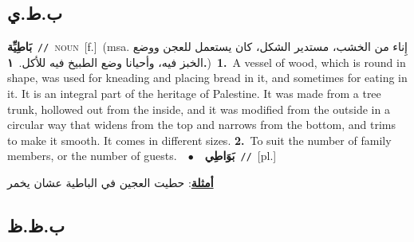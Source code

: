 \documentclass[10pt,a4paper,twoside]{article} %
\begin{document}
\begin{multicols}{2}
\vspace{-3mm}
\subsection*{\color{blue}\foreignlanguage{arabic}{ب.ط.ي}\color{blue}{}} 

{\setlength\topsep{0pt}\textbf{\foreignlanguage{arabic}{بَاطِيِّة}}\ {\color{gray}\texttt{//}\color{black}}\ \textsc{noun}\ [f.]\ \color{gray}(msa. \foreignlanguage{arabic}{إِناء من الخشب، مستدير الشكل، كان يستعمل للعجن ووضع الخبز فيه، وأحيانا وضع الطبيخ فيه للأكل.}~\foreignlanguage{arabic}{\textbf{١.}})\color{black}\ \textbf{1.}~A vessel of wood, which is round in shape, was used for kneading and placing bread in it, and sometimes for eating in it. It is an integral part of the heritage of Palestine. It was made from a tree trunk, hollowed out from the inside, and it was modified from the outside in a circular way that widens from the top and narrows from the bottom, and trims to make it smooth. It comes in different sizes.  \textbf{2.}~To suit the number of family members, or the number of guests.\ \ $\bullet$\ \ \setlength\topsep{0pt}\textbf{\foreignlanguage{arabic}{بَوَاطِي}}\ {\color{gray}\texttt{//}\color{black}}\ [pl.]\  \begin{flushright}\color{gray}\foreignlanguage{arabic}{\textbf{\underline{\foreignlanguage{arabic}{أمثلة}}}: حطيت العجين في الباطية عشان يخمر}\end{flushright}\color{black}} \vspace{2mm}

\vspace{-3mm}
\subsection*{\color{blue}\foreignlanguage{arabic}{ب.ظ.ظ}\color{blue}{}} 


\end{multicols}
\end{document}
